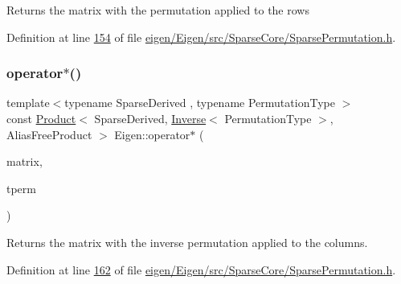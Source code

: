 \begin{DoxyReturn}{Returns}
the matrix with the permutation applied to the rows 
\end{DoxyReturn}


Definition at line \hyperlink{eigen_2_eigen_2src_2_sparse_core_2_sparse_permutation_8h_source_l00154}{154} of file \hyperlink{eigen_2_eigen_2src_2_sparse_core_2_sparse_permutation_8h_source}{eigen/\+Eigen/src/\+Sparse\+Core/\+Sparse\+Permutation.\+h}.

\mbox{\label{namespace_eigen_ad6d3d00588ad602b9d64755ab14ac2f0}} 
\subsubsection{\texorpdfstring{operator$\ast$()}{operator*()}\hspace{0.1cm}{\footnotesize\ttfamily [3/9]}}
{\footnotesize\ttfamily template$<$typename Sparse\+Derived , typename Permutation\+Type $>$ \\
const \hyperlink{group___core___module_class_eigen_1_1_product}{Product}$<$ Sparse\+Derived, \hyperlink{class_eigen_1_1_inverse}{Inverse}$<$ Permutation\+Type $>$, Alias\+Free\+Product $>$ Eigen\+::operator$\ast$ (\begin{DoxyParamCaption}\item[{const \hyperlink{group___sparse_core___module_class_eigen_1_1_sparse_matrix_base}{Sparse\+Matrix\+Base}$<$ Sparse\+Derived $>$ \&}]{matrix,  }\item[{const \hyperlink{class_eigen_1_1_inverse_impl}{Inverse\+Impl}$<$ Permutation\+Type, \hyperlink{struct_eigen_1_1_permutation_storage}{Permutation\+Storage} $>$ \&}]{tperm }\end{DoxyParamCaption})\hspace{0.3cm}{\ttfamily [inline]}}

\begin{DoxyReturn}{Returns}
the matrix with the inverse permutation applied to the columns. 
\end{DoxyReturn}


Definition at line \hyperlink{eigen_2_eigen_2src_2_sparse_core_2_sparse_permutation_8h_source_l00162}{162} of file \hyperlink{eigen_2_eigen_2src_2_sparse_core_2_sparse_permutation_8h_source}{eigen/\+Eigen/src/\+Sparse\+Core/\+Sparse\+Permutation.\+h}.

\mbox{\label{namespace_eigen_a8908bda30ef10657db0653d96ad5800e}} 
